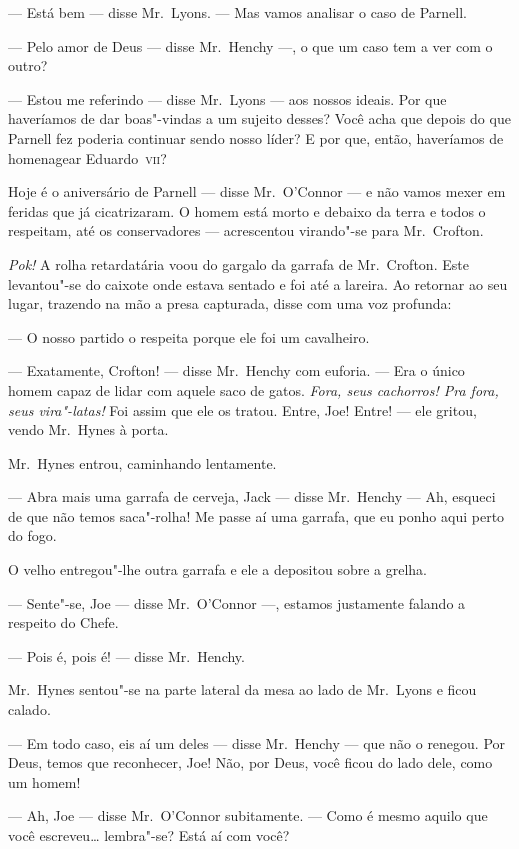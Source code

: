 --- Está bem --- disse Mr.~Lyons.  --- Mas vamos analisar o caso de Parnell.

--- Pelo amor de Deus --- disse Mr.~Henchy ---, o que um caso tem a ver com o
outro?

--- Estou me referindo --- disse Mr.~Lyons --- aos nossos ideais.  Por que
haveríamos de dar boas"-vindas a um sujeito desses?  Você acha que depois do que
Parnell fez poderia continuar sendo nosso líder?  E por que, então, haveríamos
de homenagear Eduardo~\textsc{vii}?

Hoje é o aniversário de Parnell --- disse Mr.~O’Connor --- e não vamos mexer em
feridas que já cicatrizaram.  O homem está morto e debaixo da terra e todos o
respeitam, até os conservadores --- acrescentou virando"-se para Mr.~Crofton.

\textit{Pok!} A rolha retardatária voou do gargalo da garrafa de Mr.~Crofton.
Este levantou"-se do caixote onde estava sentado e foi até a lareira.  Ao
retornar ao seu lugar, trazendo na mão a presa capturada, disse com uma voz
profunda:

--- O nosso partido o respeita porque ele foi um cavalheiro.

--- Exatamente, Crofton! --- disse Mr.~Henchy com euforia.  --- Era o único
homem capaz de lidar com aquele saco de gatos.  \textit{Fora, seus cachorros!
Pra fora, seus vira"-latas!} Foi assim que ele os tratou.  Entre, Joe!  Entre!
--- ele gritou, vendo Mr.~Hynes à porta.

Mr.~Hynes entrou, caminhando lentamente.

--- Abra mais uma garrafa de cerveja, Jack --- disse Mr.~Henchy --- Ah, esqueci
de que não temos saca"-rolha! Me passe aí uma garrafa, que eu ponho aqui perto
do fogo.

O velho entregou"-lhe outra garrafa e ele a depositou sobre a grelha.

--- Sente"-se, Joe --- disse Mr.~O’Connor ---, estamos justamente falando a
respeito do Chefe.

--- Pois é, pois é! --- disse Mr.~Henchy.

Mr.~Hynes sentou"-se na parte lateral da mesa ao lado de Mr.~Lyons e ficou
calado.

--- Em todo caso, eis aí um deles --- disse Mr.~Henchy --- que não o renegou.
Por Deus, temos que reconhecer, Joe!  Não, por Deus, você ficou do lado dele,
como um homem!

--- Ah, Joe --- disse Mr.~O’Connor subitamente.  --- Como é mesmo aquilo que
você escreveu\ldots{} lembra"-se?  Está aí com você?

